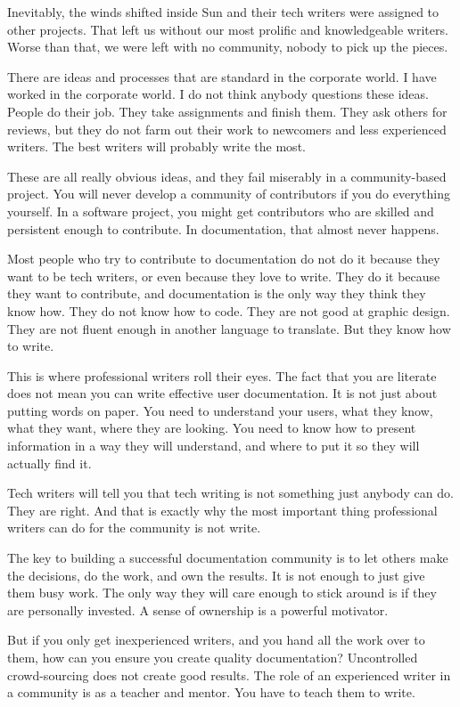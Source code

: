 Inevitably, the winds shifted inside Sun and their tech writers were
assigned to other projects. That left us without our most prolific
and knowledgeable writers. Worse than that, we were left with no
community, nobody to pick up the pieces.

There are ideas and processes that are standard in the corporate world.
I have worked in the corporate world. I do not think anybody questions
these ideas. People do their job. They take assignments and finish them.
They ask others for reviews, but they do not farm out their work to
newcomers and less experienced writers. The best writers will probably
write the most.

These are all really obvious ideas, and they fail miserably in a community-based
project. You will never develop a community of contributors if you do everything
yourself. In a software project, you might get contributors who are skilled and
persistent enough to contribute. In documentation, that almost never happens.

Most people who try to contribute to documentation do not do it because they
want to be tech writers, or even because they love to write. They do it
because they want to contribute, and documentation is the only way they
think they know how. They do not know how to code. They are not good at
graphic design. They are not fluent enough in another language to translate.
But they know how to write.

This is where professional writers roll their eyes. The fact that you are
literate does not mean you can write effective user documentation. It is
not just about putting words on paper. You need to understand your users,
what they know, what they want, where they are looking. You need to know
how to present information in a way they will understand, and where to put
it so they will actually find it.

Tech writers will tell you that tech writing is not something just anybody
can do. They are right. And that is exactly why the most important thing
professional writers can do for the community is not write.

The key to building a successful documentation community is to let others
make the decisions, do the work, and own the results. It is not enough to
just give them busy work. The only way they will care enough to stick around
is if they are personally invested. A sense of ownership is a powerful
motivator.

But if you only get inexperienced writers, and you hand all the work
over to them, how can you ensure you create quality documentation?
Uncontrolled crowd-sourcing does not create good results. The role
of an experienced writer in a community is as a teacher and mentor.
You have to teach them to write.

